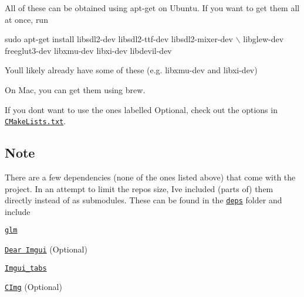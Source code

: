 All of these can be obtained using {\ttfamily apt-\/get} on Ubuntu. If you want to get them all at once, run


\begin{DoxyCode}
sudo apt-get install libsdl2-dev libsdl2-ttf-dev libsdl2-mixer-dev \(\backslash\)
    libglew-dev freeglut3-dev libxmu-dev libxi-dev libdevil-dev
\end{DoxyCode}
 You\textquotesingle{}ll likely already have some of these (e.\+g. libxmu-\/dev and libxi-\/dev)

On Mac, you can get them using {\ttfamily brew}.

If you don\textquotesingle{}t want to use the ones labelled Optional, check out the {\ttfamily option}s in \href{https://github.com/NivenT/jubilant-funicular/blob/master/CMakeLists.txt#L45}{\tt C\+Make\+Lists.\+txt}.

\subsection*{Note}

There are a few dependencies (none of the ones listed above) that come with the project. In an attempt to limit the repo\textquotesingle{}s size, I\textquotesingle{}ve included (parts of) them directly instead of as submodules. These can be found in the \href{https://github.com/NivenT/jubilant-funicular/tree/master/deps}{\tt deps} folder and include


\begin{DoxyItemize}
\item \href{https://glm.g-truc.net/0.9.8/index.html}{\tt glm}
\item \href{https://github.com/ocornut/imgui}{\tt Dear Imgui} (Optional)
\begin{DoxyItemize}
\item \href{https://github.com/ebachard/imgui_tabs}{\tt Imgui\+\_\+tabs}
\end{DoxyItemize}
\item \href{https://github.com/dtschump/CImg}{\tt C\+Img} (Optional) 
\end{DoxyItemize}